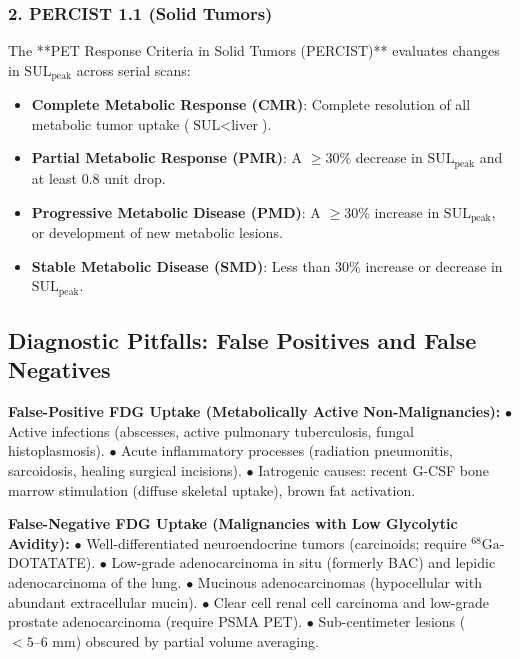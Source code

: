 \documentclass[11pt,a4paper]{article}
\begin{document}
\subsubsection{2. PERCIST 1.1 (Solid Tumors)}
The **PET Response Criteria in Solid Tumors (PERCIST)** evaluates changes in $\text{SUL}_{\text{peak}}$ across serial scans:
\begin{itemize}
    \item \textbf{Complete Metabolic Response (CMR)}: Complete resolution of all metabolic tumor uptake ($\text{SUL} < \text{liver}$).
    \item \textbf{Partial Metabolic Response (PMR)}: A $\ge 30\%$ decrease in $\text{SUL}_{\text{peak}}$ and at least $0.8\text{ unit}$ drop.
    \item \textbf{Progressive Metabolic Disease (PMD)}: A $\ge 30\%$ increase in $\text{SUL}_{\text{peak}}$, or development of new metabolic lesions.
    \item \textbf{Stable Metabolic Disease (SMD)}: Less than $30\%$ increase or decrease in $\text{SUL}_{\text{peak}}$.
\end{itemize}

\subsection{Diagnostic Pitfalls: False Positives and False Negatives}
\begin{clinicalpearl}
\textbf{False-Positive FDG Uptake (Metabolically Active Non-Malignancies):}
$\bullet$ Active infections (abscesses, active pulmonary tuberculosis, fungal histoplasmosis).
$\bullet$ Acute inflammatory processes (radiation pneumonitis, sarcoidosis, healing surgical incisions).
$\bullet$ Iatrogenic causes: recent G-CSF bone marrow stimulation (diffuse skeletal uptake), brown fat activation.

\textbf{False-Negative FDG Uptake (Malignancies with Low Glycolytic Avidity):}
$\bullet$ Well-differentiated neuroendocrine tumors (carcinoids; require $^{68}\text{Ga}$-DOTATATE).
$\bullet$ Low-grade adenocarcinoma in situ (formerly BAC) and lepidic adenocarcinoma of the lung.
$\bullet$ Mucinous adenocarcinomas (hypocellular with abundant extracellular mucin).
$\bullet$ Clear cell renal cell carcinoma and low-grade prostate adenocarcinoma (require PSMA PET).
$\bullet$ Sub-centimeter lesions ($<5\text{--}6\text{ mm}$) obscured by partial volume averaging.
\end{clinicalpearl}
\end{document}
